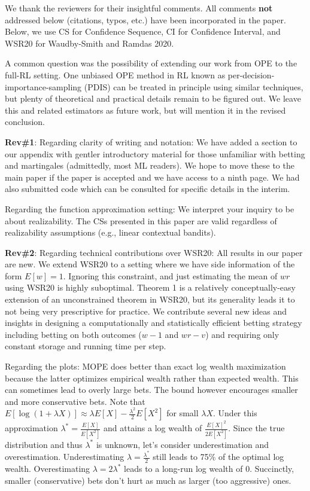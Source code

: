 \documentclass{article}
\begin{document}
We thank the reviewers for their insightful comments. 
All comments  \textbf{not} addressed below 
(citations, typos, etc.) have been incorporated in 
the paper. Below, we use CS for Confidence Sequence, 
CI for Confidence Interval, and WSR20 for Waudby-Smith
and Ramdas 2020.

A common question was the  possibility of extending our work from OPE to the full-RL setting.
One unbiased OPE method in RL known as per-decision-importance-sampling 
(PDIS) can 
be treated in principle using similar techniques, but plenty of theoretical and practical details remain to be figured out.  
We leave this and related estimators 
as future work, but will mention it in the revised conclusion.

\textbf{Rev\#1}: Regarding clarity of writing and notation: We have added a section to our appendix with gentler introductory material for those unfamiliar with betting and martingales (admittedly, most ML readers). We hope to move these to the main paper if the paper is accepted and we have access to a ninth page. We had also submitted code which can be consulted for specific details in the interim.

Regarding the function approximation setting:  We interpret your inquiry to be about realizability.  The CSs presented in this paper are valid regardless of realizability assumptions (e.g., linear contextual bandits).  

\textbf{Rev\#2}: Regarding 
technical contributions over WSR20: 
All results in our paper are new. We extend 
WSR20 to a setting 
where we have side information of the form $E[w]=1$. 
Ignoring this constraint, and just estimating the mean of $wr$ using WSR20 is highly suboptimal.
Theorem 1 is a relatively conceptually-easy 
extension of an unconstrained theorem in WSR20, but its generality leads it to not being very prescriptive for practice.
We contribute several new ideas and insights 
in designing a computationally and statistically
efficient betting strategy including
betting on both outcomes ($w-1$ and $wr-v$) and 
requiring only constant storage and running time per step.

Regarding the plots: MOPE does better than exact log wealth 
maximization because the latter optimizes
empirical wealth rather than expected wealth. This can sometimes lead to overly large bets. The bound however 
encourages smaller and more conservative bets.
Note that $E[\log(1+\lambda  X)]\approx\lambda E[X] - \frac{\lambda^2}{2} E[X^2]$ for small $\lambda X$. Under this 
approximation $\lambda^*= \frac{E[X]}{E[X^2]}$ and attains a 
log wealth of $\frac{E[X]^2}{2E[X^2]}$. Since the true distribution and thus $\lambda^*$ is unknown, let's consider 
underestimation and overestimation. Underestimating $\lambda=\frac{\lambda^*}{2}$ still leads to 75\% of the 
optimal log wealth. Overestimating 
$\lambda=2\lambda^*$ leads to a long-run log wealth of 0. 
Succinctly,  smaller (conservative) bets don't hurt as much as larger (too aggressive) ones.
\end{document}
